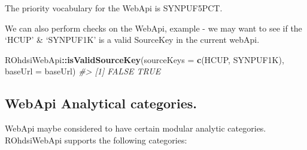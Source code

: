 \documentclass[
]{article}
\newenvironment{Shaded}{\begin{snugshade}}{\end{snugshade}}
\newcommand{\CommentTok}[1]{\textcolor[rgb]{0.56,0.35,0.01}{\textit{#1}}}
\newcommand{\DataTypeTok}[1]{\textcolor[rgb]{0.13,0.29,0.53}{#1}}
\newcommand{\KeywordTok}[1]{\textcolor[rgb]{0.13,0.29,0.53}{\textbf{#1}}}
\newcommand{\NormalTok}[1]{#1}
\newcommand{\OperatorTok}[1]{\textcolor[rgb]{0.81,0.36,0.00}{\textbf{#1}}}
\newcommand{\StringTok}[1]{\textcolor[rgb]{0.31,0.60,0.02}{#1}}
\begin{document}
The priority vocabulary for the WebApi is SYNPUF5PCT.

We can also perform checks on the WebApi, example - we may want to see
if the `HCUP' \& `SYNPUF1K' is a valid SourceKey in the current webApi.

\begin{Shaded}
\begin{Highlighting}[]

\NormalTok{ROhdsiWebApi}\OperatorTok{::}\KeywordTok{isValidSourceKey}\NormalTok{(}\DataTypeTok{sourceKeys =} \KeywordTok{c}\NormalTok{(}\StringTok{\textquotesingle{}HCUP\textquotesingle{}}\NormalTok{, }\StringTok{\textquotesingle{}SYNPUF1K\textquotesingle{}}\NormalTok{), }\DataTypeTok{baseUrl =}\NormalTok{ baseUrl)}
\CommentTok{\#> [1] FALSE  TRUE}
\end{Highlighting}
\end{Shaded}

\hypertarget{webapi-analytical-categories.}{%
\subsection{WebApi Analytical
categories.}\label{webapi-analytical-categories.}}

WebApi maybe considered to have certain modular analytic categories.
ROhdsiWebApi supports the following categories:
\end{document}
